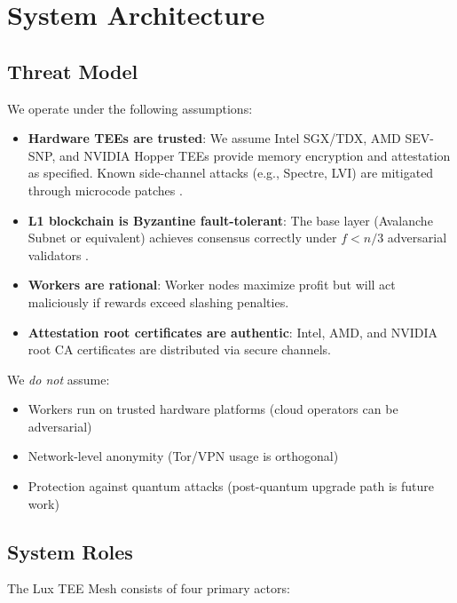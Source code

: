 \documentclass[11pt,letterpaper]{article}
\begin{document}
\section{System Architecture}

\subsection{Threat Model}

We operate under the following assumptions:

\begin{itemize}
  \item \textbf{Hardware TEEs are trusted}: We assume Intel SGX/TDX, AMD SEV-SNP, and NVIDIA Hopper TEEs provide memory encryption and attestation as specified. Known side-channel attacks (e.g., Spectre, LVI) are mitigated through microcode patches \cite{sgx-attacks}.

  \item \textbf{L1 blockchain is Byzantine fault-tolerant}: The base layer (Avalanche Subnet or equivalent) achieves consensus correctly under $f < n/3$ adversarial validators \cite{avalanche-consensus}.

  \item \textbf{Workers are rational}: Worker nodes maximize profit but will act maliciously if rewards exceed slashing penalties.

  \item \textbf{Attestation root certificates are authentic}: Intel, AMD, and NVIDIA root CA certificates are distributed via secure channels.
\end{itemize}

We \textit{do not} assume:
\begin{itemize}
  \item Workers run on trusted hardware platforms (cloud operators can be adversarial)
  \item Network-level anonymity (Tor/VPN usage is orthogonal)
  \item Protection against quantum attacks (post-quantum upgrade path is future work)
\end{itemize}

\subsection{System Roles}

The Lux TEE Mesh consists of four primary actors:
\end{document}
